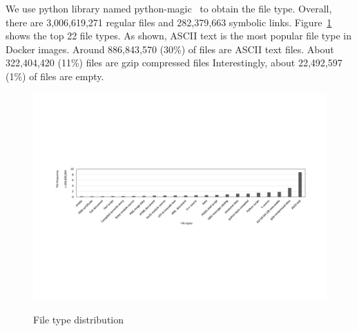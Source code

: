 We use python library named python-magic~\cite{python-magic} to obtain the file type. Overall, there are 3,006,619,271 regular files and 282,379,663 symbolic links. Figure~\ref{fig-file-type} shows the top 22 file types. As shown, ASCII text is the most popular file type in Docker images. Around 886,843,570 (30\%) of files are ASCII text files. 
About 322,404,420 (11\%) files are gzip compressed files 
Interestingly, about 22,492,597 (1\%) of files are empty.  

\begin{figure}
	\centering
	\includegraphics[width=1\textwidth]{graphs/file_type.pdf}\\
	\caption{File type distribution}\label{fig-file-type}
\end{figure}
